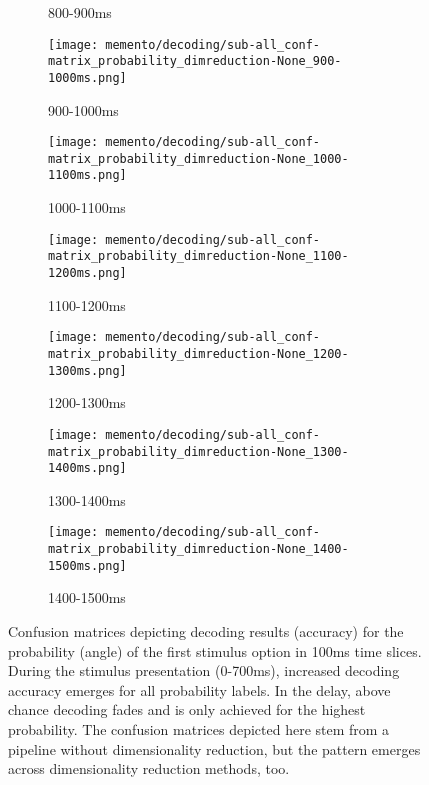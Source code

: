 \begin{figure}[H]
\begin{subfigure}{0.19\textwidth}
		\caption{800-900ms}
		\label{fig:conf8}
	\end{subfigure}
	\begin{subfigure}{0.19\textwidth}
		\texttt{[image: memento/decoding/sub-all\_conf-matrix\_probability\_dimreduction-None\_900-1000ms.png]}
		\caption{900-1000ms}
		\label{fig:conf9}
	\end{subfigure}
	\begin{subfigure}{.19\textwidth}
		\texttt{[image: memento/decoding/sub-all\_conf-matrix\_probability\_dimreduction-None\_1000-1100ms.png]}
		\caption{1000-1100ms}
		\label{fig:conf5}
	\end{subfigure}
	\begin{subfigure}{0.19\textwidth}
		\texttt{[image: memento/decoding/sub-all\_conf-matrix\_probability\_dimreduction-None\_1100-1200ms.png]}
		\caption{1100-1200ms}
		\label{fig:conf6}
	\end{subfigure}
	\begin{subfigure}{.19\textwidth}
		\texttt{[image: memento/decoding/sub-all\_conf-matrix\_probability\_dimreduction-None\_1200-1300ms.png]}
		\caption{1200-1300ms}
		\label{fig:conf7}
	\end{subfigure}
	\begin{subfigure}{0.19\textwidth}
		\texttt{[image: memento/decoding/sub-all\_conf-matrix\_probability\_dimreduction-None\_1300-1400ms.png]}
		\caption{1300-1400ms}
		\label{fig:conf8}
	\end{subfigure}
	\begin{subfigure}{0.19\textwidth}
		\texttt{[image: memento/decoding/sub-all\_conf-matrix\_probability\_dimreduction-None\_1400-1500ms.png]}
		\caption{1400-1500ms}
		\label{fig:conf9}
	\end{subfigure}
		\caption[Confusion matrices of decoding results for probability]{Confusion matrices depicting decoding results (accuracy) for the probability (angle) of the first stimulus option in 100ms time slices. During the stimulus presentation (0-700ms), increased decoding accuracy emerges for all probability labels. In the delay, above chance decoding fades and is only achieved for the highest probability. The confusion matrices depicted here stem from a pipeline without dimensionality reduction, but the pattern emerges across dimensionality reduction methods, too.}
		\label{fig:decoding-probability-conf}
	\end{figure}

